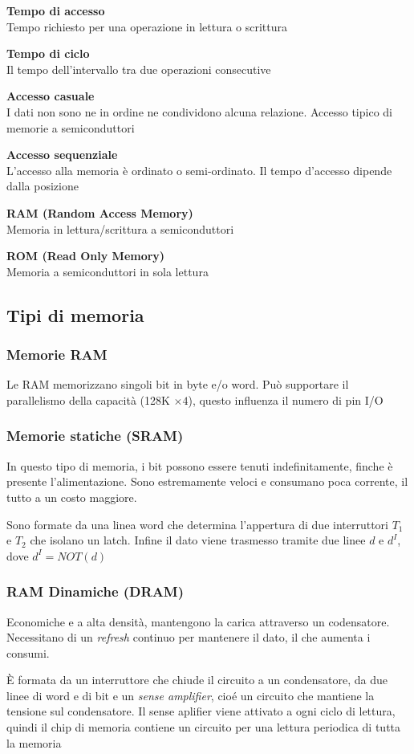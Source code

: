 \documentclass[12pt, a4paper]{article}
\begin{document}
\textbf{Tempo di accesso}\\Tempo richiesto per una operazione in lettura o scrittura

\textbf{Tempo di ciclo}\\Il tempo dell'intervallo tra due operazioni consecutive

\textbf{Accesso casuale}\\I dati non sono ne in ordine ne condividono alcuna relazione. Accesso tipico di memorie a
semiconduttori

\textbf{Accesso sequenziale}\\L'accesso alla memoria è ordinato o semi-ordinato. Il tempo d'accesso dipende dalla
posizione

\textbf{RAM (Random Access Memory)}\\Memoria in lettura/scrittura a semiconduttori

\textbf{ROM (Read Only Memory)}\\Memoria a semiconduttori in sola lettura

\subsection{Tipi di memoria}
\subsubsection{Memorie RAM}
Le RAM memorizzano singoli bit in byte e/o word. Può supportare il parallelismo della capacità (128K $\times4$),
questo influenza il numero di pin I/O

\subsubsection{Memorie statiche (SRAM)}
In questo tipo di memoria, i bit possono essere tenuti indefinitamente, finche è presente l'alimentazione. Sono 
estremamente veloci e consumano poca corrente, il tutto a un costo maggiore.

Sono formate da una linea word che determina l'appertura di due interruttori $T_{1}$ e $T_{2}$ che isolano 
un latch. Infine il dato viene trasmesso tramite due linee $d$ e $d^{I}$, dove $d^{I}=NOT(d)$

\subsubsection{RAM Dinamiche (DRAM)}
Economiche e a alta densità, mantengono la carica attraverso un codensatore. Necessitano di un \textit{refresh}
continuo per mantenere il dato, il che aumenta i consumi.

È formata da un interruttore che chiude il circuito a un condensatore, da due linee di word e di bit e un \textit{
sense amplifier}, cioé un circuito che mantiene la tensione sul condensatore. Il sense aplifier viene attivato a 
ogni ciclo di lettura, quindi il chip di memoria contiene un circuito per una lettura periodica di tutta la memoria
\end{document}
